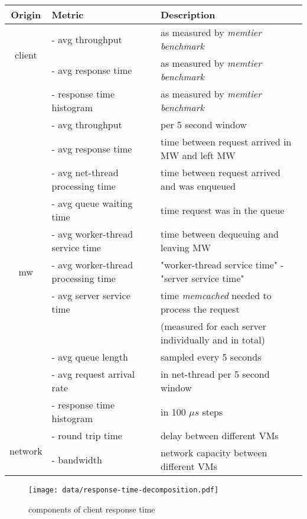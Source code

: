 \documentclass[report.tex]{subfiles}
\begin{document}
\begin{center}
\scriptsize{
\begin{tabular}{|c|l|l|}
	\hline 
	\textbf{Origin} & \textbf{Metric} & \textbf{Description} \Tstrut \\ 
	\hline 
	\multirow{2}{*}{client} & - avg throughput & as measured by \emph{memtier benchmark} \Tstrut \\ 
	& - avg response time & as measured by \emph{memtier benchmark} \\ 
	& - response time histogram & as measured by \emph{memtier benchmark} \\
	\hline 
	\multirow{11}{*}{mw} & - avg throughput & per 5 second window \Tstrut \\ 
	& - avg response time & time between request arrived in MW and left MW\\ 
	& - avg net-thread processing time & time between request arrived and was enqueued\\  
	& - avg queue waiting time & time request was in the queue \\ 
	& - avg worker-thread service time &  time between dequeuing and leaving MW\\ 
	& - avg worker-thread processing time &  "worker-thread service time" - "server service time"\\ 
	& - avg server service time & time \emph{memcached} needed to process the request \\  
	& & (measured for each server individually and in total) \\
	& - avg queue length & sampled every 5 seconds \\  
	& - avg request arrival rate & in net-thread per 5 second window \\ 
	& - response time histogram & in 100 $\mu s$ steps \\
	\hline
	\multirow{2}{*}{network} & - round trip time & delay between different VMs \Tstrut \\
	& - bandwidth & network capacity between different VMs \\
	\hline 
\end{tabular}}
\end{center}


\begin{figure}
	\centering
	\texttt{[image: data/response-time-decomposition.pdf]}
	\caption{components of client response time}\label{rt_decomposition}
\end{figure}
\end{document}
